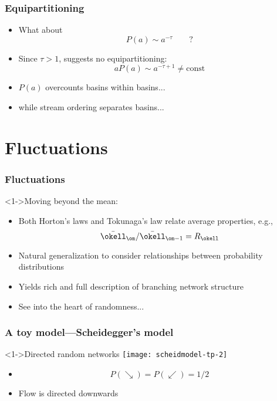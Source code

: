 \begin{frame}
  \frametitle{Equipartitioning}

  \begin{block}{}
    \begin{itemize}
    \item<1->
      What about 
      $$ P(a) \sim a^{-\tau} \qquad ? $$
    \item<2->
      Since $\tau > 1$, suggests no equipartitioning:
      $$ aP(a) \sim a^{-\tau+1} \neq \mbox{const} $$
    \item<3->
      $P(a)$ overcounts basins within basins...
    \item<4->
      while
      stream ordering separates basins...
    \end{itemize}
  \end{block}

\end{frame}


\section{Fluctuations}

\begin{frame}[label=]
    \frametitle{Fluctuations}

    \begin{block}<1->{Moving beyond the mean:}
      \begin{itemize}
      \item<2-> Both Horton's laws and Tokunaga's law
        relate average properties, e.g.,
        $$ \bar{\okell}_\om / \bar{\okell}_{\om-1} = R_\okell$$
      \item<3-> Natural generalization to consider
        relationships between \alert{probability distributions}
      \item<4-> Yields rich and full description of 
        branching network structure
      \item<5-> See into the heart of randomness...
      \end{itemize}
    \end{block}

\end{frame}

\begin{frame}[label=]
  \frametitle{A toy model---Scheidegger's model}

  \begin{block}<1->{Directed random networks\cite{scheidegger1967a,scheidegger1991a}}
    \texttt{[image: scheidmodel-tp-2]}
    \begin{itemize}
    \item<1->
      $$P(\searrow) = P (\swarrow) = 1/2$$
    \item<1->
      Flow is directed downwards
    \end{itemize}
  \end{block}

\end{frame}


